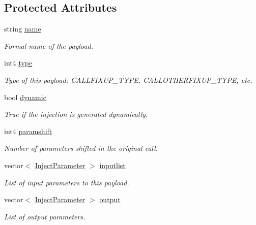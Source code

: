 \subsection*{Protected Attributes}
\begin{DoxyCompactItemize}
\item 
string \mbox{\hyperlink{class_inject_payload_a709732dc6d429767b1ef8046cc0f5573}{name}}
\begin{DoxyCompactList}\small\item\em Formal name of the payload. \end{DoxyCompactList}\item 
int4 \mbox{\hyperlink{class_inject_payload_a70d3a35fd2195fe1fb671e6280780e5b}{type}}
\begin{DoxyCompactList}\small\item\em Type of this payload\+: C\+A\+L\+L\+F\+I\+X\+U\+P\+\_\+\+T\+Y\+PE, C\+A\+L\+L\+O\+T\+H\+E\+R\+F\+I\+X\+U\+P\+\_\+\+T\+Y\+PE, etc. \end{DoxyCompactList}\item 
bool \mbox{\hyperlink{class_inject_payload_a17ef3ad9e289596c2ea756b44f03e043}{dynamic}}
\begin{DoxyCompactList}\small\item\em True if the injection is generated dynamically. \end{DoxyCompactList}\item 
int4 \mbox{\hyperlink{class_inject_payload_a0112de01e5a392fe5903bf3868d2e34b}{paramshift}}
\begin{DoxyCompactList}\small\item\em Number of parameters shifted in the original call. \end{DoxyCompactList}\item 
vector$<$ \mbox{\hyperlink{class_inject_parameter}{Inject\+Parameter}} $>$ \mbox{\hyperlink{class_inject_payload_a60b9ce0c3f608f1a9be223342948fa07}{inputlist}}
\begin{DoxyCompactList}\small\item\em List of input parameters to this payload. \end{DoxyCompactList}\item 
vector$<$ \mbox{\hyperlink{class_inject_parameter}{Inject\+Parameter}} $>$ \mbox{\hyperlink{class_inject_payload_adc1cb331a8229c5fd1dd8000cc6da97c}{output}}
\begin{DoxyCompactList}\small\item\em List of output parameters. \end{DoxyCompactList}\end{DoxyCompactItemize}


